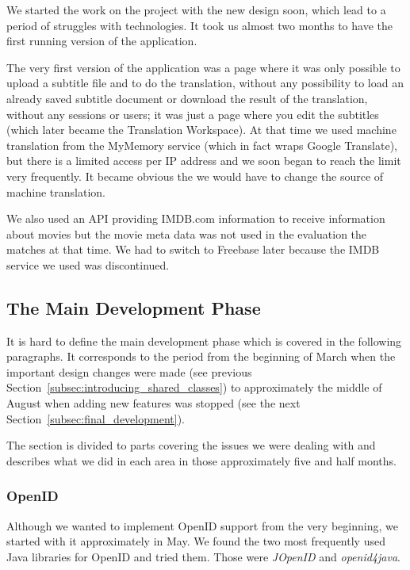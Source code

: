 We started the work on the project with the new design soon, which lead to a period of struggles with technologies. It took us almost two months to have the first running version of the application.

The very first version of the application was a page where it was only possible to upload a subtitle file and to do the translation, without any possibility to load an already saved subtitle document or download the result of the translation, without any sessions or users; it was just a page where you edit the subtitles (which later became the Translation Workspace).
At that time we used machine translation from the MyMemory service (which in fact wraps Google Translate), but there is a limited access per IP address and we soon began to reach the limit very frequently. It became obvious the we would have to change the source of machine translation.

We also used an API providing IMDB.com information to receive information about movies but the movie meta data was not used in the evaluation the matches at that time. We had to switch to Freebase later because the IMDB service we used was discontinued.

\subsection{The Main Development Phase}

It is hard to define the main development phase which is covered in the following paragraphs. It corresponds to the period from the beginning of March when the important design changes were made (see previous Section~\ref{subsec:introducing_shared_classes}) to approximately the middle of August when adding new features was stopped (see the next Section~\ref{subsec:final_development}).

The section is divided to parts covering the issues we were dealing with and describes what we did in each area in those approximately five and half months.

\subsubsection{OpenID}
\label{subsubsec:openid}

Although we wanted to implement OpenID support from the very beginning, we started with it approximately in May. We found the two most frequently used Java libraries for OpenID and tried them. Those were \emph{JOpenID} and \emph{openid4java}.

